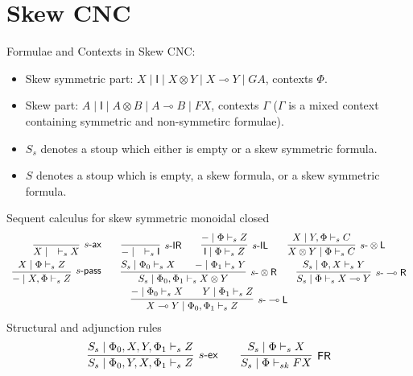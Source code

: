 \documentclass{article}
\newcommand{\tl}{\otimes \mathsf{L}}
\newcommand{\tr}{\otimes \mathsf{R}}
\newcommand{\lright}{\multimap \mathsf{R}}
\newcommand{\lleft}{\multimap \mathsf{L}}
\newcommand{\pass}{\mathsf{pass}}
\newcommand{\unitl}{\mathsf{IL}}
\newcommand{\unitr}{\mathsf{IR}}
\newcommand{\ax}{\mathsf{ax}}
\newcommand{\ot}{\otimes}
\newcommand{\lolli}{\multimap}
\newcommand{\I}{\mathsf{I}}
\newcommand{\fr}{\mathsf{FR}}
\newcommand{\td}{\text{-}}
\newcommand{\ex}{\mathsf{ex}}
\begin{document}
\section*{Skew CNC}
Formulae and Contexts in Skew CNC:
\begin{itemize}
  \item Skew symmetric part: $X \mid \I \mid X \ot Y \mid X \lolli Y \mid GA $, contexts $\Phi$.
  \item Skew part: $A \mid \I \mid A \ot B \mid A \lolli B \mid FX$, contexts $\Gamma$ ($\Gamma$ is a mixed context containing symmetric and non-symmetirc formulae).
  \item $S_{s}$ denotes a stoup which either is empty or a skew symmetric formula.
  \item $S$ denotes a stoup which is empty, a skew formula, or a skew symmetric formula.
\end{itemize}
Sequent calculus for skew symmetric monoidal closed
\vspace{-0.15cm}
 \begin{displaymath}
 \begin{array}{cc}
   \infer[s\text{-}\ax]{X \mid \quad \vdash_{s} X}{}
   \qquad
   \infer[s\text{-}\unitr]{- \mid \quad \vdash_{s} \I}{}
   \qquad
   \infer[s\text{-}\unitl]{\I \mid \Phi \vdash_{s} Z}{- \mid \Phi \vdash_{s} Z}
   \qquad
   \infer[s\text{-}\tl]{X \ot Y \mid \Phi \vdash_{s} C}{X \mid Y , \Phi \vdash_{s} C}
   \\
   \infer[s\td\pass]{- \mid X, \Phi \vdash_{s} Z}{X \mid \Phi \vdash_{s} Z}
   \qquad
   \infer[s\text{-}\tr]{S_{s} \mid \Phi_{0} , \Phi_{1} \vdash_{s} X \ot Y}{
    \deduce{S_{s} \mid \Phi_{0} \vdash_{s} X}{}
    \qquad
    \deduce{- \mid \Phi_{1} \vdash_{s} Y}{}
   }
   \qquad
   \infer[s\text{-}\lright]{S_{s} \mid \Phi \vdash_{s} X \lolli Y}{S_{s} \mid \Phi , X \vdash_{s} Y}
   \\
   \infer[s\text{-}\lleft]{X \lolli Y \mid \Phi_{0} , \Phi_{1} \vdash_{s} Z}{
    \deduce{- \mid \Phi_{0} \vdash_{s} X}{}
    \qquad
    \deduce{Y \mid \Phi_{1} \vdash_{s} Z}{}
   }
 \end{array}
 \end{displaymath}
 Structural and adjunction rules
 \begin{displaymath}
   \begin{array}{cc}
     \infer[s\text{-}\ex]{S_{s} \mid \Phi_{0} , Y , X , \Phi_{1} \vdash_{s} Z}{S_{s} \mid \Phi_{0} , X , Y , \Phi_{1} \vdash_{s} Z}
     \qquad
     \infer[\fr]{S_{s} \mid \Phi \vdash_{sk} FX}{S_{s} \mid \Phi \vdash_{s} X}
   \end{array}
 \end{displaymath}
\end{document}
